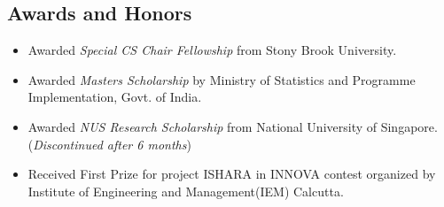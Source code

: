 \documentclass{res}
\begin{document}
\begin{resume}
\section{Awards and Honors}
   \begin{itemize}
   \item Awarded {\it Special CS Chair Fellowship} from Stony Brook University.
   \item Awarded {\it Masters Scholarship} by Ministry of Statistics and Programme Implementation, Govt. of India. 
   \item Awarded {\it NUS Research Scholarship} from National University of Singapore. ({\it Discontinued after 6 months})
   \item Received {\color{blue} First Prize} for project ISHARA in INNOVA contest organized by Institute of Engineering and Management(IEM) Calcutta.
   \end{itemize}

\end{resume}
\end{document}
